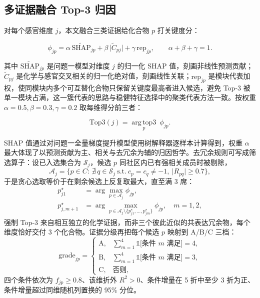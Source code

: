 \documentclass[zihao=-4,a4paper,UTF8,fontset=none]{ctexart}
\begin{document}
\subsection{多证据融合 Top-3 归因}

对每个感官维度 $j$，本文融合三类证据给化合物 $p$ 打关键度分：

\begin{equation}
\phi_{jp}=\alpha\,\widetilde{\mathrm{SHAP}}_{jp}+\beta\,\big|\tilde C_{pj}\big|+\gamma\,\mathrm{rep}_{jp},\qquad \alpha+\beta+\gamma=1.
\end{equation}

其中 $\widetilde{\mathrm{SHAP}}_{jp}$ 是问题一模型对维度 $j$ 的归一化 SHAP 值，刻画非线性预测贡献；$\tilde C_{pj}$ 是化学与感官交叉相关的归一化绝对值，刻画线性关联；$\mathrm{rep}_{jp}$ 是模块代表加权，使同模块内多个可互替化合物只保留关键度最高者进入候选，避免 Top-3 被单一模块占满，这一簇代表的思路与稳健特征选择中的聚类代表方法一致\cite{b16}。按权重 $\alpha=0.5,\beta=0.3,\gamma=0.2$ 取每维得分前三者：

\begin{equation}
\mathrm{Top3}(j)=\operatorname*{arg\,top3}_{p}\ \phi_{jp}.
\end{equation}

SHAP 值通过对问题一全量梯度提升模型使用树解释器逐样本计算得到，权重 $\alpha$ 最大体现了以预测贡献为主、相关与去冗余为辅的归因哲学。去冗余规则可写成筛选算子：设已入选集合为 $\mathcal{S}_j$，候选 $p$ 同社区内已有强相关成员时被剔除，
\begin{equation}
\mathcal{A}_j=\Big\{p\in C:\ \nexists\,q\in\mathcal{S}_j\ \text{s.t.}\ c_p=c_q\neq-1,\ \lvert R_{pq}\rvert\ge 0.7\Big\},
\end{equation}
于是贪心选取等价于在剩余候选上反复取最大，直至满 3 席：
\begin{equation}
\begin{aligned}
p^\star_{j1}&=\arg\max_{p\in\mathcal{A}_j}\phi_{jp},\\
p^\star_{j,m+1}&=\arg\max_{p\in\mathcal{A}_j\setminus\{p^\star_{j1},\dots,p^\star_{jm}\}}\phi_{jp},\quad m=1,2,
\end{aligned}
\end{equation}
强制 Top-3 来自相互独立的化学证据，而非三个彼此近似的共表达冗余物，每个维度恰好交付 3 个化合物。证据分级再把每个候选 $p$ 映射到 A/B/C 三档：
\begin{equation}
\mathrm{grade}_{jp}=\begin{cases}
\mathrm{A}, & \sum_{m=1}^{4}\mathbb{1}\big[\text{条件 } m \text{ 满足}\big]=4,\\
\mathrm{B}, & \sum_{m=1}^{4}\mathbb{1}\big[\text{条件 } m \text{ 满足}\big]=3,\\
\mathrm{C}, & \text{否则},
\end{cases}
\end{equation}
四个条件依次为 $f_{jp}\ge0.8$、该维折外 $R^2>0$、条件增量在 5 折中至少 3 折为正、条件增量超过同维随机列置换的 95\% 分位。
\end{document}
